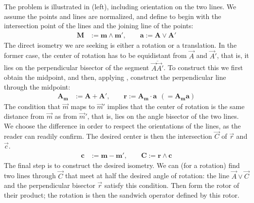 \documentclass{birkjour}
\begin{document}
The problem is illustrated in  (left), including orientation on the two lines.  We assume the points and lines are normalized, and define to begin with the intersection point of the lines and the joining line of the points:
\begin{align*} 
\mathbf{M} &:= \mathbf{m} \wedge \mathbf{m'},\qquad%
\mathbf{a} := \mathbf{A} \vee \mathbf{A'}   %
\end{align*}
The direct isometry we are seeking is either a rotation or a translation.  In the former case, the center of rotation has to be equidistant from $\vec{A}$ and $\vec{A}'$, that is, it lies on the perpendicular bisector of the segment $\overline{\vec{A}\vec{A}'}$. To construct this we first obtain the midpoint, and then, applying , construct the perpendicular line through the midpoint:
\begin{align*}
\mathbf{A_m} &:= \mathbf{A} + \mathbf{A'}, \qquad%
\mathbf{r} := \mathbf{A_m} \cdot \mathbf{a}~~ (=\mathbf{A_m} \mathbf{a})   %
\end{align*}
The condition that $\vec{m}$ maps to $\vec{m}'$ implies that the center of rotation is the same distance from $\vec{m}$ as from $\vec{m}'$, that is, lies on the angle bisector of the two lines.  We choose the difference in order to respect the orientations of the lines, as the reader can readily confirm. The desired center is then the intersection $\vec{C}$ of $\vec{r}$ and $\vec{c}$.
\begin{align*}
\mathbf{c} &:= \mathbf{m} - \mathbf{m'}, \qquad  %
\mathbf{C} := \mathbf{r} \wedge \mathbf{c}   %
\end{align*}
The final step is to construct the desired isometry.  We can (for a rotation) find two lines through $\vec{C}$ that meet at half the desired angle of rotation: the line $\vec{A} \vee \vec{C}$ and the perpendicular bisector $\vec{r}$ satisfy this condition.  Then form the rotor of their product; the rotation is then the sandwich operator defined by this rotor.  
\end{document}
